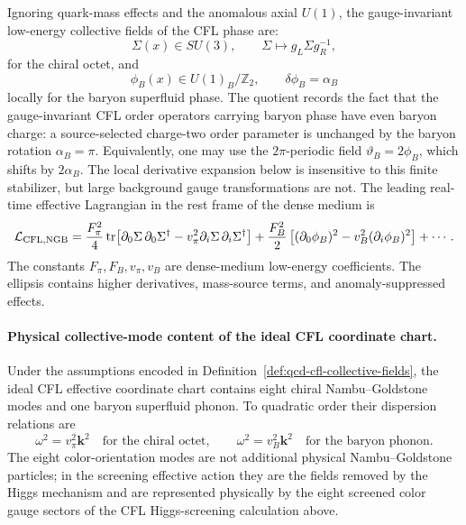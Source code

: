 \begin{definition}
\label{def:qcd-cfl-collective-fields}
Ignoring quark-mass effects and the anomalous axial \(U(1)\), the
gauge-invariant low-energy collective fields of the CFL phase are:
\[
  \Sigma(x)\in SU(3),
  \qquad
  \Sigma\longmapsto g_L\Sigma g_R^{-1},
\]
for the chiral octet, and
\[
  \phi_B(x)\in U(1)_B/\mathbb Z_2,
  \qquad
  \delta\phi_B=\alpha_B
\]
locally for the baryon superfluid phase.  The quotient records the fact that
the gauge-invariant CFL order operators carrying baryon phase have even
baryon charge: a source-selected charge-two order parameter is unchanged by
the baryon rotation \(\alpha_B=\pi\).  Equivalently, one may use the
\(2\pi\)-periodic field \(\vartheta_B=2\phi_B\), which shifts by
\(2\alpha_B\).  The local derivative expansion below is insensitive to this
finite stabilizer, but large background gauge transformations are not.  The
leading real-time effective
Lagrangian in the rest frame of the dense medium is
\begin{equation}
  \mathcal L_{\rm CFL,NGB}
  =
  \frac{F_\pi^2}{4}
  \operatorname{tr}\!\left[
    \partial_0\Sigma\,\partial_0\Sigma^\dagger
    -
    v_\pi^2\partial_i\Sigma\,\partial_i\Sigma^\dagger
  \right]
  +
  \frac{F_B^2}{2}
  \left[
    (\partial_0\phi_B)^2
    -
    v_B^2(\partial_i\phi_B)^2
  \right]
  +\cdots .
  \label{eq:qcd-cfl-ngb-effective-action}
\end{equation}
The constants \(F_\pi,F_B,v_\pi,v_B\) are dense-medium low-energy
coefficients.  The ellipsis contains higher derivatives, mass-source terms,
and anomaly-suppressed effects.
\end{definition}

\paragraph{Physical collective-mode content of the ideal CFL coordinate chart.}
\label{par:qcd-cfl-collective-mode-content}
Under the assumptions encoded in
Definition~\ref{def:qcd-cfl-collective-fields}, the ideal CFL effective
coordinate chart contains
eight chiral Nambu--Goldstone modes and one baryon superfluid phonon.  To
quadratic order their dispersion relations are
\begin{equation}
  \omega^2=v_\pi^2\mathbf k^2
  \quad\text{for the chiral octet},
  \qquad
  \omega^2=v_B^2\mathbf k^2
  \quad\text{for the baryon phonon}.
  \label{eq:qcd-cfl-ngb-dispersions}
\end{equation}
The eight color-orientation modes are not additional physical
Nambu--Goldstone particles; in the screening effective action they are the
fields removed by the Higgs mechanism and are represented physically by the
eight screened color gauge sectors of the CFL Higgs-screening calculation
above.

